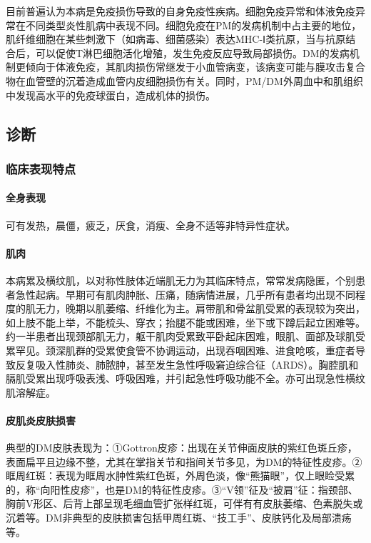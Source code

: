 目前普遍认为本病是免疫损伤导致的自身免疫性疾病。细胞免疫异常和体液免疫异常在不同类型炎性肌病中表现不同。细胞免疫在PM的发病机制中占主要的地位，肌纤维细胞在某些刺激下（如病毒、细菌感染）表达MHC-Ⅰ类抗原，当与抗原结合后，可以促使T淋巴细胞活化增殖，发生免疫反应导致局部损伤。DM的发病机制更倾向于体液免疫，其肌肉损伤常继发于小血管病变，该病变可能与膜攻击复合物在血管壁的沉着造成血管内皮细胞损伤有关。同时，PM/DM外周血中和肌组织中发现高水平的免疫球蛋白，造成机体的损伤。

\subsection{诊断}

\subsubsection{临床表现特点}

\paragraph{全身表现}

可有发热，晨僵，疲乏，厌食，消瘦、全身不适等非特异性症状。

\paragraph{肌肉}

本病累及横纹肌，以对称性肢体近端肌无力为其临床特点，常常发病隐匿，个别患者急性起病。早期可有肌肉肿胀、压痛，随病情进展，几乎所有患者均出现不同程度的肌无力，晚期以肌萎缩、纤维化为主。肩带肌和骨盆肌受累的表现较为突出，如上肢不能上举，不能梳头、穿衣；抬腿不能或困难，坐下或下蹲后起立困难等。约一半患者出现颈部肌无力，躯干肌肉受累致平卧起床困难，眼肌、面部及球肌受累罕见。颈深肌群的受累使食管不协调运动，出现吞咽困难、进食呛咳，重症者导致反复吸入性肺炎、肺脓肿，甚至发生急性呼吸窘迫综合征（ARDS）。胸腔肌和膈肌受累出现呼吸表浅、呼吸困难，并引起急性呼吸功能不全。亦可出现急性横纹肌溶解症。

\paragraph{皮肌炎皮肤损害}

典型的DM皮肤表现为：①Gottron皮疹：出现在关节伸面皮肤的紫红色斑丘疹，表面扁平且边缘不整，尤其在掌指关节和指间关节多见，为DM的特征性皮疹。②眶周红斑：表现为眶周水肿性紫红色斑，外周色淡，像“熊猫眼”，仅上眼睑受累的，称“向阳性皮疹”，也是DM的特征性皮疹。③“V领”征及“披肩”征：指颈部、胸前V形区、后背上部呈现毛细血管扩张样红斑，可伴有有皮肤萎缩、色素脱失或沉着等。DM非典型的皮肤损害包括甲周红斑、“技工手”、皮肤钙化及局部溃疡等。

